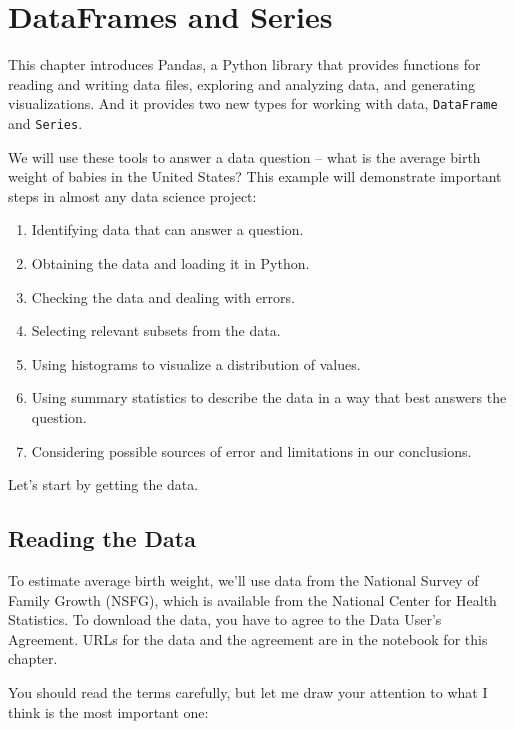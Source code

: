 \chapter{DataFrames and Series}\label{dataframes-and-series}

This chapter introduces Pandas, a Python library that provides functions
for reading and writing data files, exploring and analyzing data, and
generating visualizations. And it provides two new types for working
with data, \passthrough{\lstinline!DataFrame!} and
\passthrough{\lstinline!Series!}.

We will use these tools to answer a data question -- what is the average
birth weight of babies in the United States? This example will
demonstrate important steps in almost any data science project:

\begin{enumerate}
\def\labelenumi{\arabic{enumi}.}
\item
  Identifying data that can answer a question.
\item
  Obtaining the data and loading it in Python.
\item
  Checking the data and dealing with errors.
\item
  Selecting relevant subsets from the data.
\item
  Using histograms to visualize a distribution of values.
\item
  Using summary statistics to describe the data in a way that best
  answers the question.
\item
  Considering possible sources of error and limitations in our
  conclusions.
\end{enumerate}

Let's start by getting the data.

\section{Reading the Data}\label{reading-the-data}

To estimate average birth weight, we'll use data from the National
Survey of Family Growth (NSFG), which is available from the National
Center for Health Statistics. To download the data, you have to agree to
the Data User's Agreement. URLs for the data and the agreement are in
the notebook for this chapter.

You should read the terms carefully, but let me draw your attention to
what I think is the most important one:

